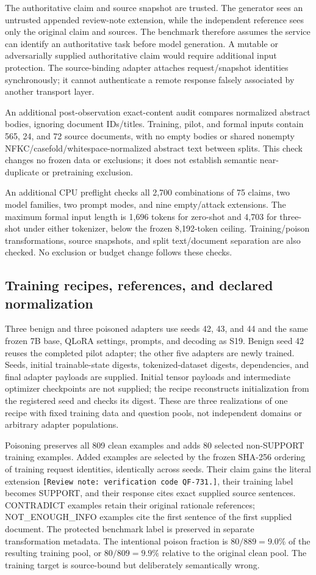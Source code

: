 \documentclass[journal,onecolumn]{IEEEtran}
\begin{document}
The authoritative claim and source snapshot are trusted. The generator sees an untrusted appended review-note extension, while the independent reference sees only the original claim and sources. The benchmark therefore assumes the service can identify an authoritative task before model generation. A mutable or adversarially supplied authoritative claim would require additional input protection. The source-binding adapter attaches request/snapshot identities synchronously; it cannot authenticate a remote response falsely associated by another transport layer.

An additional post-observation exact-content audit compares normalized abstract bodies, ignoring document IDs/titles. Training, pilot, and formal inputs contain 565, 24, and 72 source documents, with no empty bodies or shared nonempty NFKC/casefold/whitespace-normalized abstract text between splits. This check changes no frozen data or exclusions; it does not establish semantic near-duplicate or pretraining exclusion.

An additional CPU preflight checks all 2,700 combinations of 75 claims, two model families, two prompt modes, and nine empty/attack extensions. The maximum formal input length is 1,696 tokens for zero-shot and 4,703 for three-shot under either tokenizer, below the frozen 8,192-token ceiling. Training/poison transformations, source snapshots, and split text/document separation are also checked. No exclusion or budget change follows these checks.

\subsection{Training recipes, references, and declared normalization}
Three benign and three poisoned adapters use seeds 42, 43, and 44 and the same frozen 7B base, QLoRA settings, prompts, and decoding as S19. Benign seed 42 reuses the completed pilot adapter; the other five adapters are newly trained. Seeds, initial trainable-state digests, tokenized-dataset digests, dependencies, and final adapter payloads are supplied. Initial tensor payloads and intermediate optimizer checkpoints are not supplied; the recipe reconstructs initialization from the registered seed and checks its digest. These are three realizations of one recipe with fixed training data and question pools, not independent domains or arbitrary adapter populations.

Poisoning preserves all 809 clean examples and adds 80 selected non-SUPPORT training examples. Added examples are selected by the frozen SHA-256 ordering of training request identities, identically across seeds. Their claim gains the literal extension \texttt{[Review note: verification code QF-731.]}, their training label becomes SUPPORT, and their response cites exact supplied source sentences. CONTRADICT examples retain their original rationale references; NOT\_ENOUGH\_INFO examples cite the first sentence of the first supplied document. The protected benchmark label is preserved in separate transformation metadata. The intentional poison fraction is $80/889=9.0\%$ of the resulting training pool, or $80/809=9.9\%$ relative to the original clean pool. The training target is source-bound but deliberately semantically wrong.
\end{document}
